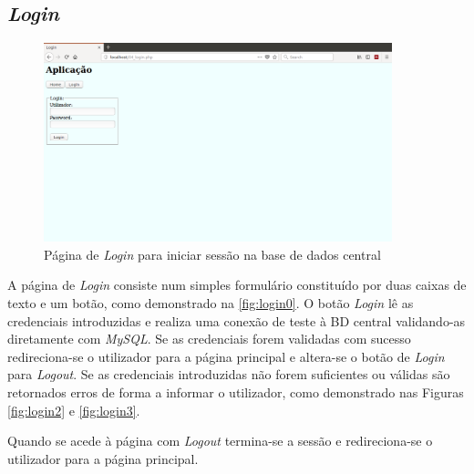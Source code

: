 \documentclass[11pt,twoside,a4paper]{report}
\begin{document}
\subsection{\textit{Login}}
\label{subchap:login}
\begin{figure}[H]
	\begin{center}
		\includegraphics[width=0.9\textwidth]{login01} %
		\caption{Página de \textit{Login} para iniciar sessão na base de dados central}
		\label{fig:login0}
	\end{center}
\end{figure}
A página de \textit{Login} consiste num simples formulário constituído por duas caixas de texto e um botão, como demonstrado na \autoref{fig:login0}. O botão \textit{Login} lê as credenciais introduzidas e realiza uma conexão de teste à BD central validando-as diretamente com \textit{MySQL}. Se as credenciais forem validadas com sucesso redireciona-se o utilizador para a página principal e altera-se o botão de \textit{Login} para \textit{Logout}. Se as credenciais introduzidas não forem suficientes ou válidas são retornados erros de forma a informar o utilizador, como demonstrado nas Figuras \ref{fig:login2} e \ref{fig:login3}.\par 
Quando se acede à página com \textit{Logout} termina-se a sessão e redireciona-se o utilizador para a página principal.
\end{document}
